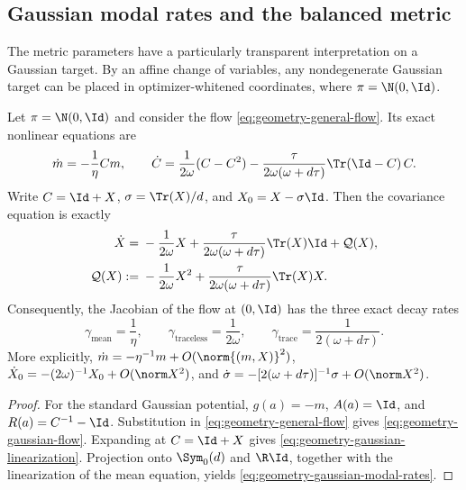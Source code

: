 \subsection{Gaussian modal rates and the balanced metric}
\label{sec:geometry-balance}

The metric parameters have a particularly transparent interpretation on a
Gaussian target.  By an affine change of variables, any nondegenerate
Gaussian target can be placed in optimizer-whitened coordinates, where
$\pi=\N(0,\Id)$.

\begin{theorem}
\label{thm:geometry-gaussian-modes}
Let $\pi=\N(0,\Id)$ and consider the flow
\eqref{eq:geometry-general-flow}.  Its exact nonlinear equations are
\begin{equation}
\label{eq:geometry-gaussian-flow}
    \dot m=-\frac1\eta Cm,
    \qquad
    \dot C=\frac1{2\omega}(C-C^2)
       -\frac{\tau}{2\omega(\omega+d\tau)}\Tr(\Id-C)\,C.
\end{equation}
Write $C=\Id+X$, $\sigma=\Tr(X)/d$, and
$X_0=X-\sigma\Id$.  Then the covariance equation is exactly
\begin{align}
\label{eq:geometry-gaussian-linearization}
    \dot X
    ={}&-\frac1{2\omega}X
       +\frac{\tau}{2\omega(\omega+d\tau)}\Tr(X)\Id
       +\mathcal Q(X), \\
    \mathcal Q(X)
    :={}&-\frac1{2\omega}X^2
       +\frac{\tau}{2\omega(\omega+d\tau)}\Tr(X)X.
\end{align}
Consequently, the Jacobian of the flow at $(0,\Id)$ has the three exact
decay rates
\begin{equation}
\label{eq:geometry-gaussian-modal-rates}
    \gamma_{\mathrm{mean}}=\frac1\eta,
    \qquad
    \gamma_{\mathrm{traceless}}=\frac1{2\omega},
    \qquad
    \gamma_{\mathrm{trace}}=\frac1{2(\omega+d\tau)}.
\end{equation}
More explicitly,
$\dot m=-\eta^{-1}m+O(\norm{(m,X)}^2)$,
$\dot X_0=-(2\omega)^{-1}X_0+O(\norm X^2)$, and
$\dot\sigma=-[2(\omega+d\tau)]^{-1}\sigma+O(\norm X^2)$.
\end{theorem}

\begin{proof}
For the standard Gaussian potential, $g(a)=-m$, $A(a)=\Id$, and
$R(a)=C^{-1}-\Id$.  Substitution in
\eqref{eq:geometry-general-flow} gives
\eqref{eq:geometry-gaussian-flow}.  Expanding at $C=\Id+X$ gives
\eqref{eq:geometry-gaussian-linearization}.  Projection onto
$\Sym_0(d)$ and $\R\Id$, together with the linearization of the mean
equation, yields \eqref{eq:geometry-gaussian-modal-rates}.
\end{proof}


